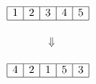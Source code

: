\documentclass[varwidth]{standalone}
\begin{document}
$\begin{array}{|c|c|c|c|c|}
    \hline
    1 & 2 & 3 & 4 & 5 \\
    \hline
\end{array}$ \\ \\
$\qquad \quad\,\,\,\Downarrow$ \\ \\
$\begin{array}{|c|c|c|c|c|}
    \hline
    4 & 2 & 1 & 5 & 3 \\
    \hline
\end{array}
$
\end{document}
